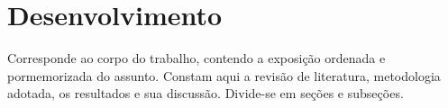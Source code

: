 \chapter{Desenvolvimento}

Corresponde ao corpo do trabalho, contendo a exposição ordenada e pormemorizada
do assunto. Constam aqui a revisão de literatura, metodologia adotada, os resultados e
sua discussão. Divide-se em seções e subseções. \cite{Robert2007}